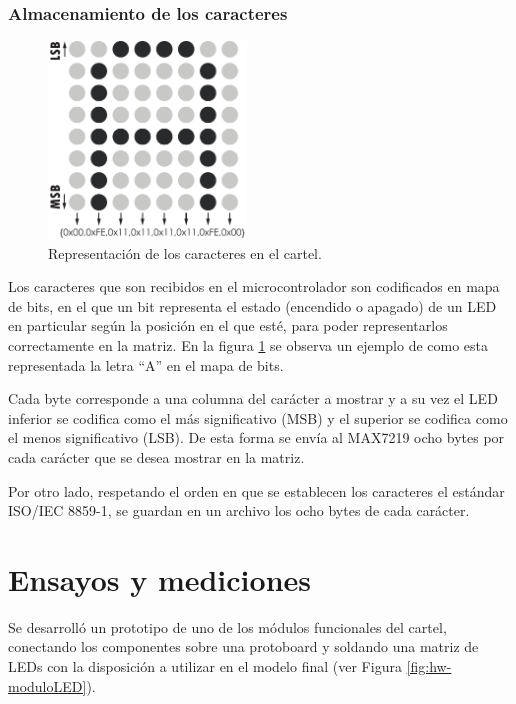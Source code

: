 \subsubsection{Almacenamiento de los caracteres}
\begin{figure}
    \centering
    \includegraphics[width=0.47\textwidth]{imagenes/codificacionAscii.pdf}
    \caption{Representación de los caracteres en el cartel.}
    \label{fig:repAscii}
\end{figure}


Los caracteres que son recibidos en el microcontrolador son codificados en mapa de bits, en el que un bit representa el estado (encendido o apagado) de un LED en particular según la posición en el que esté, para poder representarlos correctamente en la matriz. En la figura \ref{fig:repAscii} se observa un ejemplo de como esta representada la letra \enquote{A} en el mapa de bits.

Cada byte corresponde a una columna del carácter a mostrar y a su vez el LED inferior se codifica como el más significativo (MSB) y el superior se codifica como el menos significativo (LSB). De esta forma se envía al MAX7219 ocho bytes por cada carácter que se desea mostrar en la matriz.

Por otro lado, respetando el orden en que se establecen los caracteres el estándar ISO/IEC 8859-1, se guardan en un archivo los ocho bytes de cada carácter.

\section{Ensayos y mediciones}
Se desarrolló un prototipo de uno de los módulos funcionales del cartel, conectando los componentes sobre una protoboard y soldando una matriz de LEDs con la disposición a utilizar en el modelo final (ver Figura \ref{fig:hw-moduloLED}).

